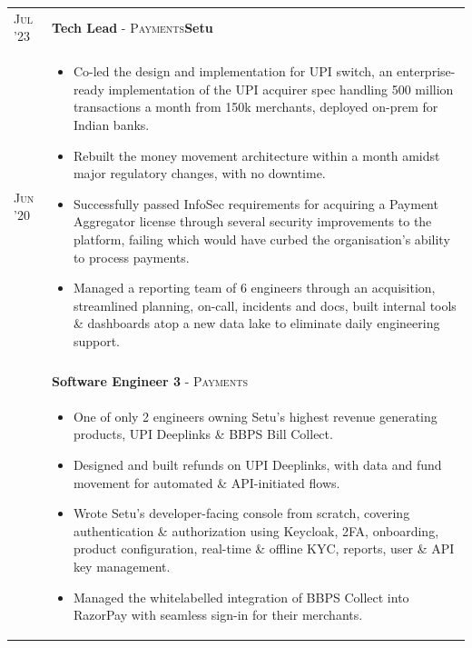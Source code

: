 \documentclass[a4paper,10pt]{extarticle} %
\begin{document}
\begin{tabularx}{\linewidth}{l | X}
\textsc{Jul '23} & \textbf{Tech Lead} \textsc{- Payments}\hfill\raisebox{-.2\height}{ \hspace{0.3em}}\textbf{Setu}\\
\textsc{Jun '20} & \begin{itemize}[leftmargin=*, nosep, before=\vspace{-0.8\baselineskip}, after=\vspace{-1.0\baselineskip}]
  \item Co-led the design and implementation for UPI switch, an enterprise-ready implementation of the UPI acquirer spec handling 500 million transactions a month from 150k merchants, deployed on-prem for Indian banks.
  \item Rebuilt the money movement architecture within a month amidst major regulatory changes, with no downtime.
  \item Successfully passed InfoSec requirements for acquiring a Payment Aggregator license through several security improvements to the platform, failing which would have curbed the organisation's ability to process payments.
  \item Managed a reporting team of 6 engineers through an acquisition, streamlined planning, on-call, incidents and docs, built internal tools \& dashboards atop a new data lake to eliminate daily engineering support.
\end{itemize}\\\\
& \textbf{Software Engineer 3} \textsc{- Payments}\\
& \begin{itemize}[leftmargin=*, nosep, before=\vspace{-0.8\baselineskip}, after=\vspace{-1.0\baselineskip}]
  \item One of only 2 engineers owning Setu's highest revenue generating products, UPI Deeplinks \& BBPS Bill Collect.
  \item Designed and built refunds on UPI Deeplinks, with data and fund movement for automated \& API-initiated flows.
  \item Wrote Setu's developer-facing console from scratch, covering authentication \& authorization using Keycloak, 2FA, onboarding, product configuration, real-time \& offline KYC, reports, user \& API key management.
  \item Managed the whitelabelled integration of BBPS Collect into RazorPay with seamless sign-in for their merchants.

\end{itemize}
\end{tabularx}
\end{document}
